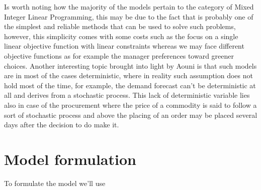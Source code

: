 \documentclass{article}
\begin{document}
  Is worth noting how the majority of the models pertain to the category of Mixed Integer Linear Programming, this may be due to the fact that is probably one of the simplest and reliable methods that can be used to solve such problems, however, this simplicity comes with some costs such as the focus on a single linear objective function with linear constraints whereas we may face different objective functions as for example the manager preferences toward greener choices. Another interesting topic brought into light by Aouni \cite{azimian_supply_2017} is that such models are in most of the cases deterministic, where in reality such assumption does not hold most of the time, for example, the demand forecast can't be deterministic at all and derives from a stochastic process. This lack of deterministic variable lies also in case of the procurement where the price of a commodity is said to follow a sort of stochastic process and above the placing of an order may be placed several days after the decision to do make it.


\section{Model formulation}
  To formulate the model we'll use
\end{document}

